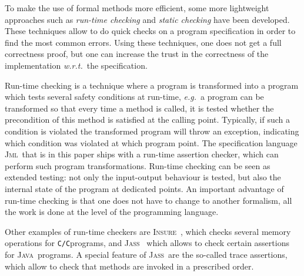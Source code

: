 \documentclass[a4paper]{llncs}
\newcommand{\jml}{\textsc{Jml}}
\newcommand{\jass}{\textsc{Jass}}
\newcommand{\java}{\textsc{Java}}
\newcommand{\cPP}{\texttt{C/C}\nolinebreak\hspace{-.05em}\raisebox{.4ex}{\tiny\bf
+}\nolinebreak\hspace{-.10em}\raisebox{.4ex}{\tiny\bf +}}
\newcommand{\insPP}{\textsc{Insure\nolinebreak\hspace{-.05em}\raisebox{.4ex}{\tiny\bf
+}\nolinebreak\hspace{-.10em}\raisebox{.4ex}{\tiny\bf +}}}
\begin{document}

To make the use of formal methods more efficient, some more
lightweight approaches such as
\textit{run-time checking} and
\textit{static checking} have been developed. These techniques allow 
to do quick checks on a program specification in order to find the
most common errors. Using these techniques, one does not get a full
correctness proof, but one can increase the trust in the correctness
of the implementation \emph{w.r.t.}~the specification.

Run-time checking is a technique where a program is transformed into a 
program which tests several safety conditions at run-time,
\emph{e.g.}~a program can be transformed so that every time a method 
is called, it is tested whether the precondition of this method is
satisfied at the calling point. Typically, if such a condition is
violated the transformed program will throw an exception, indicating
which condition was violated at which program point. The specification
language \jml\ that is in this paper ships with a run-time assertion
checker, which can perform such program transformations. Run-time
checking can be seen as extended testing: not only the input-output
behaviour is tested, but also the internal state of the program at
dedicated points. An important advantage of run-time checking is that
one does not have to change to another formalism, all the work is done
at the level of the programming language.

Other examples of run-time checkers are \insPP~\cite{InsurePP}, which
checks several memory operations for \cPP programs, and
\jass~\cite{bartetzko01assertions} which allows to check certain
assertions for \java\ programs. A special feature of \jass\ are the
so-called trace assertions, which allow to check that methods are
invoked in a prescribed order.
\end{document}
